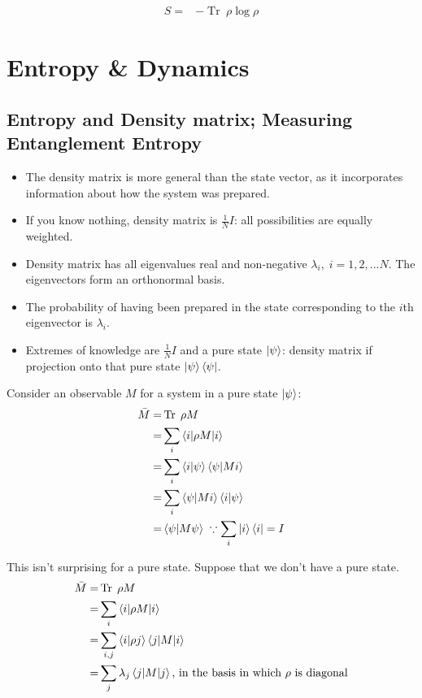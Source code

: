 \documentclass[]{article}
\DeclareMathOperator{\Tr}{Tr \;}
\begin{document}
\begin{align*}
	S =& -\Tr \rho \log{\rho}
\end{align*}


\section{Entropy \& Dynamics}

\subsection{Entropy and Density matrix; Measuring Entanglement Entropy} 

\begin{itemize}
	\item The density matrix is more general than the state vector, as it incorporates information about how the system was prepared. 
	\item If you know nothing, density matrix is $\frac{1}{N}I$: all possibilities are equally weighted.
	\item Density matrix has all eigenvalues real and non-negative $\lambda_i,\; i=1,2,...N$. The eigenvectors form an orthonormal basis.
	\item  The probability of having been prepared in the state corresponding to the $i$th eigenvector is $\lambda_i$.
	\item Extremes of knowledge are $\frac{1}{N}I$ and a pure state $\ket{\psi}$: density matrix if projection onto that pure state $\ket{\psi} \bra{\psi}$. 
\end{itemize}

Consider an observable $M$ for a system in a pure state $\ket{\psi}$:
\begin{align*}
	\bar{M} =& \Tr \rho M\\
	=& \sum_i \braket{i \vert \rho M \vert i}\\
	=& \sum_i \braket{i \vert \psi}\braket{\psi \vert M i}\\
	=& \sum_i \braket{\psi \vert M i} \braket{i \vert \psi}\\
	=& \braket{\psi \vert M \psi} \; \because \sum_i \ket{i}\bra{i}=I
\end{align*}

This isn't surprising for a pure state. Suppose that we don't have a pure state.
\begin{align*}
	\bar{M} =& \Tr \rho M\\
	=& \sum_i \braket{i \vert \rho M \vert i} \\
	=& \sum_{i,j} \braket{i\vert\rho j} \braket{j\vert M \vert i}\\
	=& \sum_j \lambda_j \braket{j\vert M \vert j} \text{, in the basis in which $\rho$ is diagonal}
\end{align*}
\end{document}
